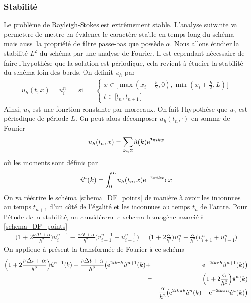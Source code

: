 \subsubsection{Stabilité}\label{Stabilité_EI}
Le problème de Rayleigh-Stokes est extrêmement stable. L'analyse suivante va permettre de mettre en évidence le caractère stable en temps long du schéma mais aussi la propriété de filtre passe-bas que possède $\alpha$. Nous allons étudier la stabilité $L^2$ du schéma par une analyse de Fourier. Il est cependant nécessaire de faire l'hypothèse que la solution est périodique, cela revient à étudier la stabilité du schéma loin des bords. On définit $u_h$ par
\begin{eqnarray*}
    u_h(t,x) = u_i^n \ \ \ &\text{ si }& \ \ \ \left\{\begin{array}{l}
        x \in \big[\max(x_i-\frac{h}{2},0), \min(x_i+\frac{h}{2},L)\big[ \\
        t \in [t_n,t_{n+1}[
    \end{array}\right.
\end{eqnarray*}
Ainsi, $u_h$ est une fonction constante par morceaux. On fait l'hypothèse que $u_h$ est périodique de période $L$. On peut alors décomposer $u_h(t_n,\cdot)$ en somme de Fourier
\begin{equation*}
    u_h(t_n,x)=\sum_{k \in \mathbb{Z}} \hat{u}(k)\mathrm{e}^{2\pi i kx}
\end{equation*}
où les moments sont définis par
\begin{equation*}
    \hat{u}^n(k)=\int_0^Lu_h(t_n,x)\mathrm{e}^{-2\pi ikx}\mathrm{d}x
\end{equation*}
On va réécrire le schéma \eqref{schema_DF_points} de manière à avoir les inconnues au temps $t_{n+1}$ d'un côté de l'égalité et les inconnues au temps $t_n$ de l'autre. Pour l'étude de la stabilité, on considérera le schéma homogène associé à \eqref{schema_DF_points}
\begin{eqnarray*}
    \Big(1+2\frac{\nu \Delta t+\alpha}{h^2}\Big)u_i^{n+1}-\frac{\nu\Delta t + \alpha}{h^2}\big(u_{i+1}^{n+1}+u^{n+1}_{i-1}\big) = \Big(1+2\frac{\alpha}{h^2}\Big)u_i^n - \frac{\alpha}{h^2}\big(u_{i+1}^n+u_{i-1}^n\big)
\end{eqnarray*}
On applique à présent la transformée de Fourier à ce schéma
\begin{eqnarray*}
    \Big(1+2\frac{\nu \Delta t+\alpha}{h^2}\Big)\hat{u}^{n+1}(k)-\frac{\nu\Delta t + \alpha}{h^2}\big(\mathrm{e}^{2ik\pi h}\hat{u}^{n+1}(k) &+&\mathrm{e}^{-2ik\pi h}\hat{u}^{n+1}(k)\big) \\ 
    &=& \Big(1+2\frac{\alpha}{h^2}\Big)\hat{u}^n(k) \\
    &-& \frac{\alpha}{h^2}\big(\mathrm{e}^{2ik\pi h}\hat{u}^n(k)+\mathrm{e}^{-2ik\pi h}\hat{u}^n(k)\big)
\end{eqnarray*}
